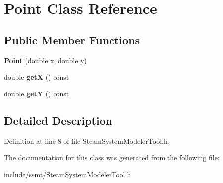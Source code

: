 \hypertarget{class_point}{}\section{Point Class Reference}
\label{class_point}
\subsection*{Public Member Functions}
\begin{DoxyCompactItemize}
\item 
\mbox{\label{class_point_a78b55e8d5466bb8c2cf60fa55f2562ff}} 
{\bfseries Point} (double x, double y)
\item 
\mbox{\label{class_point_a655794dd595a4821987664bf1d9010e8}} 
double {\bfseries getX} () const
\item 
\mbox{\label{class_point_aa323a12bec85e28ce6575dccec4f8b28}} 
double {\bfseries getY} () const
\end{DoxyCompactItemize}


\subsection{Detailed Description}


Definition at line 8 of file Steam\+System\+Modeler\+Tool.\+h.



The documentation for this class was generated from the following file\+:\begin{DoxyCompactItemize}
\item 
include/ssmt/Steam\+System\+Modeler\+Tool.\+h\end{DoxyCompactItemize}
